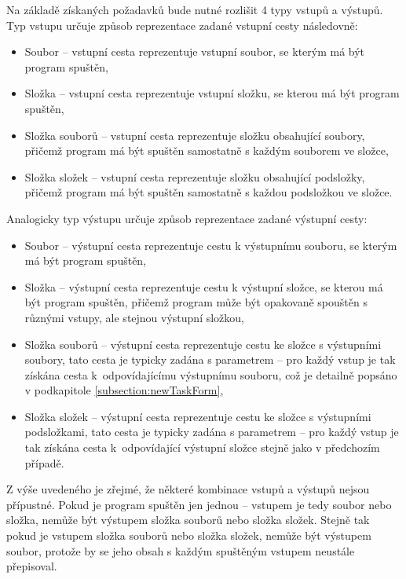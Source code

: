 Na základě získaných požadavků bude nutné rozlišit 4 typy vstupů a výstupů. Typ vstupu určuje způsob reprezentace zadané vstupní cesty následovně:

\begin{itemize}
    \item Soubor -- vstupní cesta reprezentuje vstupní soubor, se kterým má být program spuštěn,
    \item Složka -- vstupní cesta reprezentuje vstupní složku, se kterou má být program spuštěn,
    \item Složka souborů -- vstupní cesta reprezentuje složku obsahující soubory, přičemž program má být spuštěn samostatně s každým souborem ve složce,
    \item Složka složek -- vstupní cesta reprezentuje složku obsahující podsložky, přičemž program má být spuštěn samostatně s každou podsložkou ve složce.
\end{itemize}

Analogicky typ výstupu určuje způsob reprezentace zadané výstupní cesty:

\begin{itemize}
    \item Soubor -- výstupní cesta reprezentuje cestu k výstupnímu souboru, se kterým má být program spuštěn,
    \item Složka -- výstupní cesta reprezentuje cestu k výstupní složce, se kterou má být program spuštěn, přičemž program může být opakovaně spouštěn s různými vstupy, ale stejnou výstupní složkou,
    \item Složka souborů -- výstupní cesta reprezentuje cestu ke složce s výstupními soubory, tato cesta je typicky zadána s parametrem -- pro každý vstup je tak získána cesta k~odpovídajícímu výstupnímu souboru, což je detailně popsáno v podkapitole \ref{subsection:newTaskForm},
    \item Složka složek -- výstupní cesta reprezentuje cestu ke složce s výstupními podsložkami, tato cesta je typicky zadána s parametrem -- pro každý vstup je tak získána cesta k~odpovídající výstupní složce stejně jako v předchozím případě.
\end{itemize}

Z výše uvedeného je zřejmé, že některé kombinace vstupů a výstupů nejsou přípustné. Pokud je program spuštěn jen jednou -- vstupem je tedy soubor nebo složka, nemůže být výstupem složka souborů nebo složka složek. Stejně tak pokud je vstupem složka souborů nebo složka složek, nemůže být výstupem soubor, protože by se jeho obsah s každým spuštěným vstupem neustále přepisoval. 


